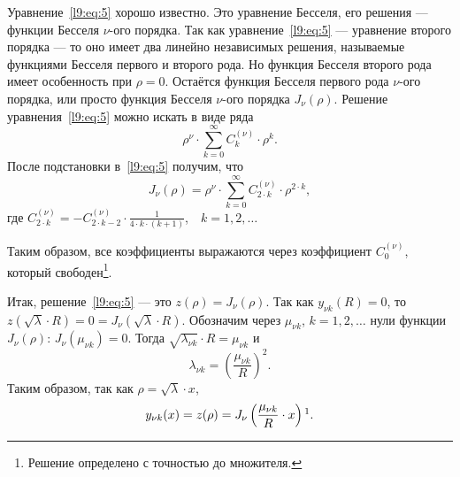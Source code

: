 Уравнение~\eqref{l9:eq:5} хорошо известно. Это уравнение Бесселя, его решения --- функции Бесселя $\nu$-ого порядка. Так как уравнение~\eqref{l9:eq:5} --- уравнение второго порядка --- то оно имеет два линейно независимых решения, называемые функциями Бесселя первого и второго рода. Но функция Бесселя второго рода имеет особенность при $\rho=0$. Остаётся функция Бесселя первого рода $\nu$-ого порядка, или просто функция Бесселя $\nu$-ого порядка $J_\nu(\rho)$. Решение уравнения~\eqref{l9:eq:5} можно искать в виде ряда
\begin{equation*}
	\rho^{\nu}\cdot\sum\limits_{k=0}^{\infty}C_k^{(\nu)}\cdot\rho^k.
\end{equation*}  
После подстановки в~\eqref{l9:eq:5} получим, что 
\begin{equation}\label{l9:eq:6}
	 J_{\nu}(\rho)=\rho^{\nu}\cdot\sum\limits_{k=0}^{\infty}C_{2\cdot k}^{(\nu)}\cdot\rho^{2\cdot k},
\end{equation}
где $\displaystyle C_{2\cdot k}^{(\nu)}=-C_{2\cdot k-2}^{(\nu)}\cdot\frac{1}{4\cdot k\cdot(k+1)}$,$\quad k=1,2,\ldots$

\noindent Таким образом{\mb,} все коэффициенты выражаются через коэффициент $C_0^{(\nu)}$, который свободен\footnote{Решение определено с точностью до множителя.}.

Итак, решение~\eqref{l9:eq:5} --- это $z(\rho)=J_{\nu}(\rho)$. Так как $y_{\nu k}(R)=0$, то $z(\sqrt{\lambda}\cdot R)=0=J_{\nu}\left(\sqrt{\lambda}\cdot R\right)$. Обозначим через $\mu_{\nu k}$, $k=1,2,\ldots$ нули функции $J_{\nu}(\rho):\,J_{\nu}\left(\mu_{\nu k}\right)=0$. Тогда $\sqrt{\lambda_{\nu k}}\cdot R=\mu_{\nu k}$ и 
\begin{equation}\label{l9:eq:7}
	\lambda_{\nu k}=\left(\frac{\mu_{\nu k}}{R}\right)^2.
\end{equation}
Таким образом{\mb,} так как $\rho=\sqrt{\lambda}\cdot x${\mb,}
\begin{equation}\label{l9:eq:8}
	 y_{\nu k}(x)=z(\rho)=J_{\nu}\left(\frac{\mu_{\nu k}}{R}\cdot x\right)\footnotemark{}.
\end{equation}

